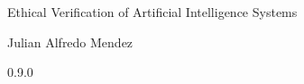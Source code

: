 \documentclass[12pt,a4paper]{book}
\begin{document}
    \begin{center}

        \phantom{H}

        \vspace{80mm}

        {\huge{Ethical Verification of Artificial Intelligence Systems}}

        \vspace{80mm}
        Julian Alfredo Mendez

        \vspace{10mm}
        0.9.0

    \end{center}

    \newpage

    
    
    
    

    
    

    
    
    
    
    
\end{document}
